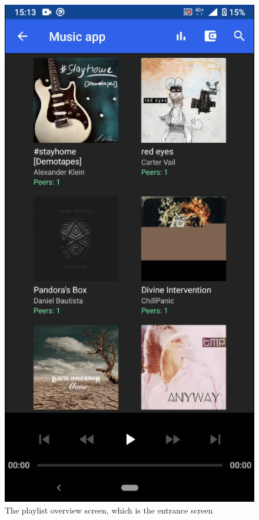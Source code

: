 \begin{figure}[]
        \includegraphics[width=1\linewidth]{implementation/screenshot-overview.png}
        \caption{The playlist overview screen, which is the entrance screen}
        \label{fig:screenshot-home}

\end{figure}
